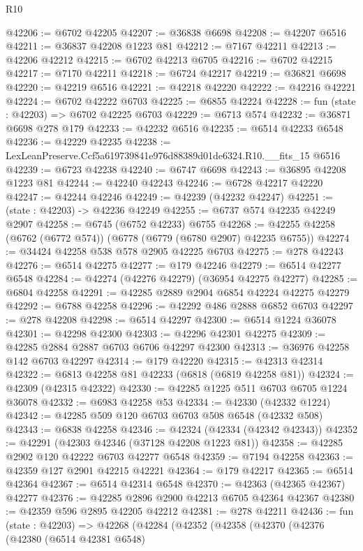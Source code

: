 \begin{lexlean}{R10}
\begin{coremodule}
@42206 := @6702 @42205
@42207 := @36838 @6698
@42208 := @42207 @6516
@42211 := @36837 @42208 @1223 @81
@42212 := @7167 @42211
@42213 := @42206 @42212
@42215 := @6702 @42213 @6705
@42216 := @6702 @42215
@42217 := @7170 @42211
@42218 := @6724 @42217
@42219 := @36821 @6698
@42220 := @42219 @6516
@42221 := @42218 @42220
@42222 := @42216 @42221
@42224 := @6702 @42222 @6703
@42225 := @6855 @42224
@42228 := fun (state : @42203) => @6702 @42225 @6703
@42229 := @6713 @574
@42232 := @36871 @6698 @278 @179
@42233 := @42232 @6516
@42235 := @6514 @42233 @6548
@42236 := @42229 @42235
@42238 := LexLeanPreserve.Ccf5a619739841e976d88389d01de6324.R10.__fits_15 @6516
@42239 := @6723 @42238
@42240 := @6747 @6698
@42243 := @36895 @42208 @1223 @81
@42244 := @42240 @42243
@42246 := @6728 @42217 @42220
@42247 := @42244 @42246
@42249 := @42239 (@42232 @42247)
@42251 := (state : @42203) -> @42236 @42249
@42255 := @6737 @574 @42235 @42249 @2907
@42258 := @6745 (@6752 @42233) @6755
@42268 := @42255 @42258 (@6762 (@6772 @574)) (@6778 (@6779 (@6780 @2907) @42235 @6755))
@42274 := @34424 @42258 @538 @578 @2905 @42225 @6703
@42275 := @278 @42243
@42276 := @6514 @42275
@42277 := @179 @42246
@42279 := @6514 @42277 @6548
@42284 := @42274 (@42276 @42279) (@36954 @42275 @42277)
@42285 := @6804 @42258
@42291 := @42285 @2889 @2904 @6854 @42224 @42275 @42279
@42292 := @6788 @42258
@42296 := @42292 @486 @2888 @6852 @6703
@42297 := @278 @42208
@42298 := @6514 @42297
@42300 := @6514 @1224 @36078
@42301 := @42298 @42300
@42303 := @42296 @42301 @42275
@42309 := @42285 @2884 @2887 @6703 @6706 @42297 @42300
@42313 := @36976 @42258 @142 @6703 @42297
@42314 := @179 @42220
@42315 := @42313 @42314
@42322 := @6813 @42258 @81 @42233 (@6818 (@6819 @42258 @81))
@42324 := @42309 (@42315 @42322)
@42330 := @42285 @1225 @511 @6703 @6705 @1224 @36078
@42332 := @6983 @42258 @53
@42334 := @42330 (@42332 @1224)
@42342 := @42285 @509 @120 @6703 @6703 @508 @6548 (@42332 @508)
@42343 := @6838 @42258
@42346 := @42324 (@42334 (@42342 @42343))
@42352 := @42291 (@42303 @42346 (@37128 @42208 @1223 @81))
@42358 := @42285 @2902 @120 @42222 @6703 @42277 @6548
@42359 := @7194 @42258
@42363 := @42359 @127 @2901 @42215 @42221
@42364 := @179 @42217
@42365 := @6514 @42364
@42367 := @6514 @42314 @6548
@42370 := @42363 (@42365 @42367) @42277
@42376 := @42285 @2896 @2900 @42213 @6705 @42364 @42367
@42380 := @42359 @596 @2895 @42205 @42212
@42381 := @278 @42211
@42436 := fun (state : @42203) =>
  @42268
    (@42284
      (@42352
        (@42358
          (@42370
            (@42376
              (@42380
                (@6514 @42381 @6548)

\end{coremodule}
\end{lexlean}
